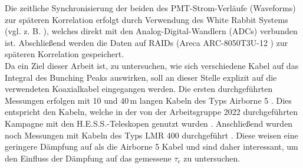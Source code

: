 Die zeitliche Synchronisierung der beiden des PMT-Strom-Verläufe (Waveforms) zur späteren Korrelation erfolgt durch Verwendung des White Rabbit Systems (vgl. z. B. \cite{lipinskiWhiteRabbitPTP2011}), welches direkt mit den Analog-Digital-Wandlern (ADCs) verbunden ist. 
Abschließend werden die Daten auf RAIDs (Areca ARC-8050T3U-12 \cite{ARC8050T3UThunderboltUSB}) zur späteren Korrelation gespeichert. \\
Da ein Ziel dieser Arbeit ist, zu untersuchen, wie sich verschiedene Kabel auf das Integral des Bunching Peaks auswirken, soll an dieser Stelle explizit auf die verwendeten Koaxialkabel eingegangen werden. 
Die ersten durchgeführten Messungen erfolgen mit 10 und 40\,m langen Kabeln des Typs Airborne 5 \cite{s.r.lAirborne10Coaxial}. 
Dies entspricht den Kabeln, welche in der von der Arbeitsgruppe 2022 durchgeführten Kampagne mit den H.E.S.S.-Teleskopen genutzt wurden \cite{zmijaFirstIntensityInterferometry2023}. 
Anschließend wurden noch Messungen mit Kabeln des Typs LMR 400 durchgeführt \cite{LMR400CoaxCable}. 
Diese weisen eine geringere Dämpfung auf als die Airborne 5 Kabel und sind daher interessant, um den Einfluss der Dämpfung auf das gemessene $\tau_{\mathrm{c}}$ zu untersuchen. \\

